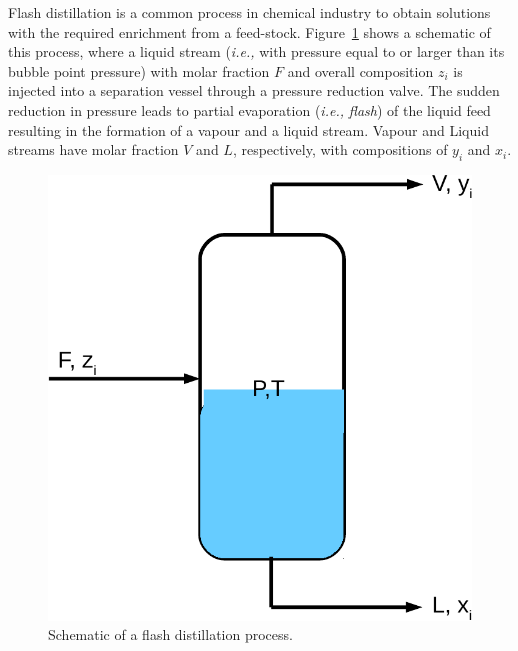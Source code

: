 \documentclass[12pts,a4paper,amsmath,amssymb,floatfix]{article}%
\newcommand{\ie}{{\it i.e., }}
\begin{document}
Flash distillation is a common process in chemical industry to obtain solutions with the required enrichment from a feed-stock. Figure~\ref{Mod04Fig06} shows a schematic of this process, where a liquid stream (\ie with pressure equal to or larger than its bubble point pressure) with molar fraction $F$ and overall composition $z_{i}$ is injected into a separation vessel through a pressure reduction valve. The sudden reduction in pressure leads to partial evaporation (\ie {\it flash}) of the liquid feed resulting in the formation of a vapour and a liquid stream. Vapour and Liquid streams have molar fraction $V$ and $L$, respectively, with compositions of $y_{i}$ and $x_{i}$. 
  \begin{figure}[h]
     \begin{center}
         \includegraphics[width=.7\linewidth,clip]{./Figs/FlashDistillation}
     \end{center}
     \caption{Schematic of a flash distillation process.}\label{Mod04Fig06}
  \end{figure}
        
\end{document}

